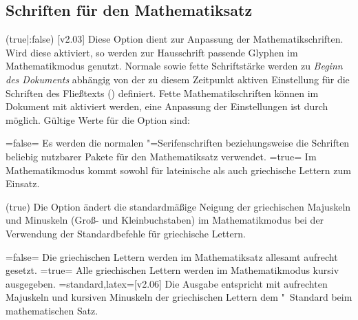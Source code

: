 \begin{DeclareEntity*}{}
\begin{DeclareEntity*}{}
\begin{DeclareEntity*}{}
\subsection{%
  Schriften für den Mathematiksatz%
  \label{sec:math}%
}
%
\begin{Declaration}
  {}
  (true|:false)
  [v2.03]
\printdeclarationlist
%
Diese Option dient zur Anpassung der Mathematikschriften. Wird diese aktiviert, 
so werden zur Hausschrift passende Glyphen im Mathematikmodus genutzt. Normale 
sowie fette Schriftstärke werden zu \emph{Beginn des Dokuments} abhängig von 
der zu diesem Zeitpunkt aktiven Einstellung für die Schriften des Fließtexts 
() definiert. Fette Mathematikschriften 
können im Dokument mit  aktiviert werden, eine Anpassung der 
Einstellungen ist durch  möglich. Gültige Werte für die 
Option  sind:
%
\begin{DeclareValues}
\itemval=false=
  Es werden die normalen "=Serifenschriften beziehungsweise die 
  Schriften beliebig nutzbarer Pakete für den Mathematiksatz verwendet.
\itemval*=true=
  Im Mathematikmodus kommt \OpenSans sowohl für lateinische als auch 
  griechische Lettern zum Einsatz.
\end{DeclareValues}
\end{Declaration}

\begin{Declaration}
  {}
  (true)
Die Option ändert die standardmäßige Neigung der griechischen Majuskeln und 
Minuskeln (Groß- und Kleinbuchstaben) im Mathematikmodus bei der Verwendung 
der Standardbefehle für griechische Lettern.
%
\begin{DeclareValues}
\itemval=false=
  Die griechischen Lettern werden im Mathematiksatz allesamt aufrecht gesetzt.
\itemval*=true=
  Alle griechischen Lettern werden im Mathematikmodus kursiv ausgegeben.
\itemval=standard,latex=[v2.06]
  Die Ausgabe entspricht mit aufrechten Majuskeln und kursiven Minuskeln der 
  griechischen Lettern dem "~Standard beim mathematischen Satz.
\end{DeclareValues}
\end{Declaration}


\end{DeclareEntity*}
\end{DeclareEntity*}
\end{DeclareEntity*}
